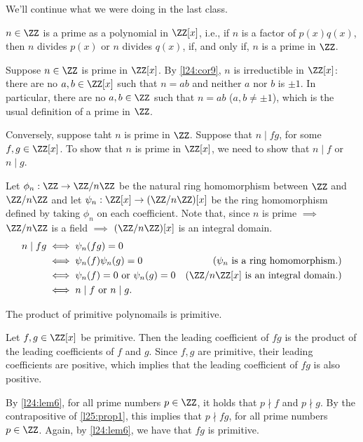 
We'll continue what we were doing in the last class.

\begin{prop}\label{l25:prop1}
	$n \in \ZZ$ is a prime as a polynomial in $\ZZ[x]$, i.e., if $n$ is a factor of $p(x)q(x)$, then $n$ divides $p(x)$ or $n$ divides $q(x)$, if, and only if, $n$ is a prime in $\ZZ$. 
\end{prop}

\begin{dem}
	Suppose $n \in \ZZ$ is prime in $\ZZ[x]$. By \cref{l24:cor9}, $n$ is irreductible in $\ZZ[x]$: there are no $a, b \in \ZZ[x]$ such that $n = ab$ and neither $a$ nor $b$ is $\pm 1$. In particular, there are no $a, b \in \ZZ$ such that $n = ab$ ($a, b \neq \pm 1$), which is the usual definition of a prime in $\ZZ$.

	Conversely, suppose taht $n$ is prime in $\ZZ$. Suppose that $n \mid fg$, for some  $f, g \in \ZZ[x]$. To show that $n$ is prime in $\ZZ[x]$, we need to show that $n\mid f$ or $n\mid g$.
	
	Let $\phi_n: \ZZ \to \ZZ/n\ZZ$ be the natural ring homomorphism between $\ZZ$ and $\ZZ/n\ZZ$ and let $\psi_n: \ZZ[x] \to (\ZZ/n\ZZ)[x]$ be the ring homomorphism defined by taking $\phi_n$ on each coefficient.
	Note that, since $n$ is prime $\implies$ $\ZZ/n\ZZ$ is a field $\implies$ $(\ZZ/n\ZZ)[x]$ is an integral domain.
	\begin{align*}
		n \mid fg & \iff \psi_n(fg) = 0 \\
				  & \iff \psi_n(f)\psi_n(g) = 0 & \text{($\psi_n$ is a ring homomorphism.)} \\
				  & \iff \psi_n(f) = 0 \text{\ or\ } \psi_n(g) = 0 & \text{($\ZZ/n\ZZ[x]$ is an integral domain.)}\\
				  & \iff n \mid f \text{\ or\ } n \mid g.
	\end{align*}
\end{dem}

\begin{thm}\label{l25:gauss}
	The product of primitive polynomails is primitive.
\end{thm}

\begin{dem}
	Let $f, g \in \ZZ[x]$ be primitive. Then the leading coefficient of $fg$ is the product of the leading coefficients of $f$ and $g$. Since $f, g$ are primitive, their leading coefficients are positive, which implies that the leading coefficient of $fg$ is also positive.

	By \cref{l24:lem6}, for all prime numbers $p \in \ZZ$, it holds that $p \nmid f$ and $p \nmid g$.
	By the contrapositive of \cref{l25:prop1}, this implies that $p \nmid fg$, for all prime numbers $p \in \ZZ$.  Again, by \cref{l24:lem6}, we have that $fg$ is primitive.
\end{dem}

